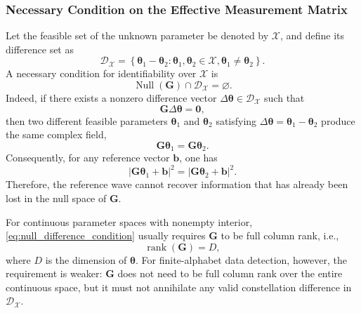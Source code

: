 \documentclass[journal]{IEEEtran}
\begin{document}
\subsubsection{Necessary Condition on the Effective Measurement Matrix}

Let the feasible set of the unknown parameter be denoted by $\mathcal{X}$, and define its difference set as
\begin{equation}
\mathcal{D}_{\mathcal{X}}
=
\left\{
\boldsymbol{\theta}_1-\boldsymbol{\theta}_2:
\boldsymbol{\theta}_1,\boldsymbol{\theta}_2\in\mathcal{X},
\boldsymbol{\theta}_1\neq\boldsymbol{\theta}_2
\right\}.
\end{equation}
A necessary condition for identifiability over $\mathcal{X}$ is
\begin{equation}
\operatorname{Null}(\mathbf{G})
\cap
\mathcal{D}_{\mathcal{X}}
=
\varnothing.
\label{eq:null_difference_condition}
\end{equation}
Indeed, if there exists a nonzero difference vector 
$\Delta\boldsymbol{\theta}\in\mathcal{D}_{\mathcal{X}}$ such that
\begin{equation}
\mathbf{G}\Delta\boldsymbol{\theta}=\mathbf{0},
\end{equation}
then two different feasible parameters $\boldsymbol{\theta}_1$ and $\boldsymbol{\theta}_2$ satisfying 
$\Delta\boldsymbol{\theta}=\boldsymbol{\theta}_1-\boldsymbol{\theta}_2$ produce the same complex field,
\begin{equation}
\mathbf{G}\boldsymbol{\theta}_1
=
\mathbf{G}\boldsymbol{\theta}_2.
\end{equation}
Consequently, for any reference vector $\mathbf{b}$, one has
\begin{equation}
|\mathbf{G}\boldsymbol{\theta}_1+\mathbf{b}|^2
=
|\mathbf{G}\boldsymbol{\theta}_2+\mathbf{b}|^2.
\end{equation}
Therefore, the reference wave cannot recover information that has already been lost in the null space of $\mathbf{G}$.

For continuous parameter spaces with nonempty interior, \eqref{eq:null_difference_condition} usually requires $\mathbf{G}$ to be full column rank, i.e.,
\begin{equation}
\operatorname{rank}(\mathbf{G})=D,
\label{eq:G_full_column_rank}
\end{equation}
where $D$ is the dimension of $\boldsymbol{\theta}$. 
For finite-alphabet data detection, however, the requirement is weaker: $\mathbf{G}$ does not need to be full column rank over the entire continuous space, but it must not annihilate any valid constellation difference in $\mathcal{D}_{\mathcal{X}}$.
\end{document}
